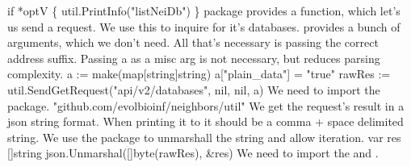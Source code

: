 if *optV \{
          util.PrintInfo("listNeiDb")
\}
\nwendcode{}\nwdocspar
{} package provides a function, which let's us send a
 request. We use this to inquire  for it's databases.
 provides a bunch of arguments, which we don't need. All
that's necessary is passing the correct address suffix. Passing a 
 as a misc arg is not necessary, but reduces parsing 
complexity. 
\nwenddocs{}\endmoddef\nwstartdeflinemarkup{}\nwenddeflinemarkup
a := make(map[string]string)
a["plain_data"] = "true"
rawRes := util.SendGetRequest("api/v2/databases", nil, nil, a)
\nwendcode{}\nwdocspar
We need to import the  package.
\nwenddocs{}\plusendmoddef\nwstartdeflinemarkup{}\nwenddeflinemarkup
"github.com/evolbioinf/neighbors/util"
\nwendcode{}\nwdocspar
We get the request's result in a json string format. When printing it to 
 it should be a comma + space delimited string. We use the 
 package to unmarshall the string and allow iteration. 
\nwenddocs{}\plusendmoddef\nwstartdeflinemarkup{}\nwenddeflinemarkup
var res []string
json.Unmarshal([]byte(rawRes), &res)
\nwendcode{}\nwdocspar
We need to import the  and .
\nwenddocs{}\plusendmoddef\nwstartdeflinemarkup{}\nwenddeflinemarkup
